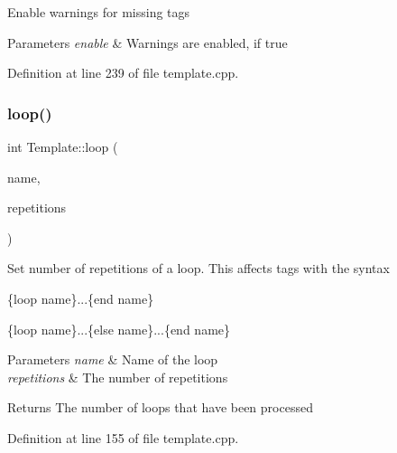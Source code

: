 Enable warnings for missing tags 
\begin{DoxyParams}{Parameters}
{\em enable} & Warnings are enabled, if true \\
\hline
\end{DoxyParams}


Definition at line 239 of file template.\+cpp.

\mbox{\label{classstefanfrings_1_1_template_a9d8bcef23c0d34b0947ea0270be5b137}} 
\subsubsection{\texorpdfstring{loop()}{loop()}}
{\footnotesize\ttfamily int Template\+::loop (\begin{DoxyParamCaption}\item[{Q\+String}]{name,  }\item[{int}]{repetitions }\end{DoxyParamCaption})}

Set number of repetitions of a loop. This affects tags with the syntax


\begin{DoxyItemize}
\item \{loop name\}...\{end name\}
\item \{loop name\}...\{else name\}...\{end name\}
\end{DoxyItemize}


\begin{DoxyParams}{Parameters}
{\em name} & Name of the loop \\
\hline
{\em repetitions} & The number of repetitions \\
\hline
\end{DoxyParams}
\begin{DoxyReturn}{Returns}
The number of loops that have been processed 
\end{DoxyReturn}


Definition at line 155 of file template.\+cpp.

\mbox{\label{classstefanfrings_1_1_template_a68bfaf8f993d7942107cb2eb0dab9e7b}} 
